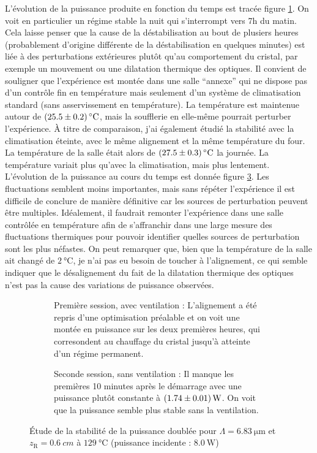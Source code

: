 \documentclass[11pt,a4paper] { article}
\newcommand{\zr}{z_\mathsc{R}}
\newcommand{\mathsc}[1]{\mathrm{\scriptscriptstyle {#1}}}
\begin{document}
L'évolution de la puissance produite en fonction du temps est tracée figure \ref{fig:mesc1}. On voit en particulier un régime stable la nuit qui s'interrompt vers 7h du matin. Cela laisse penser que la cause de la déstabilisation au bout de plusiers heures (probablement d'origine différente de la déstabilisation en quelques minutes) est liée à des perturbations extérieures plutôt qu'au comportement du cristal, par exemple un mouvement ou une dilatation thermique des optiques. Il convient de souligner que l'expérience est montée dans une salle ``annexe'' qui ne dispose pas d'un contrôle fin en température mais seulement d'un système de climatisation standard (sans asservissement en température). La température est maintenue autour de $\SI{25.5+-0.2}{\celsius}$, mais la soufflerie en elle-même pourrait perturber l'expérience. À titre de comparaison, j'ai également étudié la stabilité avec la climatisation éteinte, avec le même alignement et la même température du four. La température de la salle était alors de $\SI{27.5+-0.3}{\celsius}$ la journée. La température variait plus qu'avec la climatisation, mais plus lentement. L'évolution de la puissance au cours du temps est donnée figure \ref{fig:mesc2}. Les fluctuations semblent moins importantes, mais sans répéter l'expérience il est difficile de conclure de manière définitive car les sources de perturbation peuvent être multiples. Idéalement, il faudrait remonter l'expérience dans une salle contrôlée en température afin de s'affranchir dans une large mesure des fluctuations thermiques pour pouvoir identifier quelles sources de perturbation sont les plus néfastes. On peut remarquer que, bien que la température de la salle ait changé de $\SI{2}{\celsius}$, je n'ai pas eu besoin de toucher à l'alignement, ce qui semble indiquer que le désalignement du fait de la dilatation thermique des optiques n'est pas la cause des variations de puissance observées.

\begin{figure}[htpb]  
\centering
\begin{subfigure}[b]{\textwidth}
	\centering
	
	\caption{Première session, avec ventilation : \small L'alignement a été repris d'une optimisation préalable et on voit une montée en puissance sur les deux premières heures, qui corresondent au chauffage du cristal jusqu'à atteinte d'un régime permanent.}
	\label{fig:mesc1}
\end{subfigure}
\begin{subfigure}[b]{\textwidth}
	\centering
	
	\caption{Seconde session, sans ventilation : \small Il manque les premières 10 minutes après le démarrage avec une puissance plutôt constante à $\SI{1.74+-0.01}{\watt}$. On voit que la puissance semble plus stable sans la ventilation.}
	\label{fig:mesc2}
\end{subfigure}
\caption{Étude de la stabilité de la puissance doublée pour $\Lambda=\SI{6.83}{\micro\meter}$ et $\zr = \SI{0.6}{cm}$ à $\SI{129}{\celsius}$ (puissance incidente : $\SI{8.0}{\watt}$)}
\end{figure}
\end{document}
